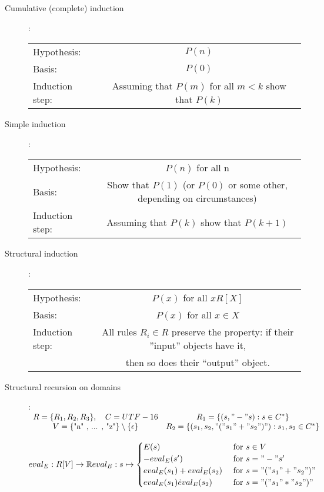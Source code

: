 \documentclass[12pt]{article}
\begin{document}
\begin{description}
\item[Cumulative (complete) induction]:\\ 
\begin{tabular}{l c}
Hypothesis: & $P(n)$  \\
Basis: & $P(0)$  \\
Induction step: & Assuming that $P(m)$ for all $m < k$ show that $P(k)$
\end{tabular}
\item[Simple induction]:\\ 
\begin{tabular}{l c}
Hypothesis: & $P(n)$ for all n \\
Basis: & Show that $P(1)$ (or $P(0)$ or some other, depending on circumstances) \\
Induction step: & Assuming that $P(k)$ show that $P(k + 1)$
\end{tabular}
\item[Structural induction]:\\ 
\begin{tabular}{l c}
Hypothesis: & $P(x)$  for all $x R[X]$ \\
Basis: & $P(x)$ for all $x \in X$  \\
Induction step: & All rules $R_i \in R$ preserve the property: if their ''input'' objects have it, \\ 
& then so does their “output” object. 
\end{tabular}
\item[Structural recursion on domains]:\\ 

\begin{math}  \begin{array}{cc}
 R = \{R_1 ,R_2 ,R_3 \}, \quad C = UTF-16 & R_1 = \{(s,"-" s): s \in C^*\} \\
 V = \{ \textrm{"a" , ... , "z"}\}\setminus \{\epsilon\} & R_2 = \{(s_1,s_2, "(" s_1 "+" s_2 ")"): s_1 , s_2 \in C^*\}
\end{array}
\end{math}

\begin{math}
eval_E : R[V] \rightarrow \mathbb{R} \\
eval_E : s \mapsto  \begin{cases}
 E(s) & \textrm{ for } s \in V \\
 -eval_E (s') & \textrm{ for } s = "-" s' \\
 eval_E (s_1) + eval_E (s_2) & \textrm{ for } s = "(" s_1 "+" s_2 ")" \\
 eval_E (s_1) \dot eval_E (s_2) & \textrm{ for } s = "(" s_1 "*" s_2 ")"
\end{cases}
\end{math} 


\end{description}
\end{document}
